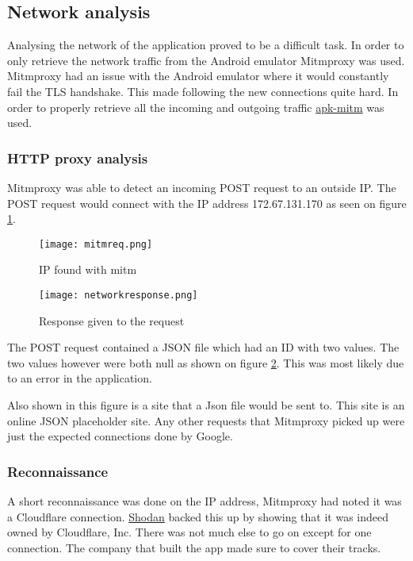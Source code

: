 \subsection{Network analysis}

Analysing the network of the application proved to be a difficult task. 
In order to only retrieve the network traffic from the Android emulator Mitmproxy was used.
Mitmproxy had an issue with the Android emulator where it would constantly fail the TLS handshake. 
This made following the new connections quite hard. 
In order to properly retrieve all the incoming and outgoing traffic \href{https://github.com/shroudedcode/apk-mitm}{apk-mitm} was used.

\subsubsection{HTTP proxy analysis}

Mitmproxy was able to detect an incoming POST request to an outside IP. 
The POST request would connect with the IP address 172.67.131.170 as seen on figure \ref{tim-mitmrequest}.

\begin{figure}[H]
    \texttt{[image: mitmreq.png]}
    \caption{IP found with mitm}
    \label{tim-mitmrequest}
\end{figure}

\begin{figure}[H]
    \texttt{[image: networkresponse.png]}
    \caption{Response given to the request}
    \label{tim-mitmresponse}
\end{figure}

The POST request contained a JSON file which had an ID with two values. 
The two values however were both null as shown on figure \ref{tim-mitmresponse}.
This was most likely due to an error in the application. 

Also shown in this figure is a site that a Json file would be sent to.
This site is an online JSON placeholder site.
Any other requests that Mitmproxy picked up were just the expected connections done by Google.

\subsubsection{Reconnaissance}

A short reconnaissance was done on the IP address, Mitmproxy had noted it was a Cloudflare connection.
\href{https://www.shodan.io/host/172.67.131.170}{Shodan} backed this up by showing that it was indeed owned by Cloudflare, Inc.
There was not much else to go on except for one connection.
The company that built the app made sure to cover their tracks.
